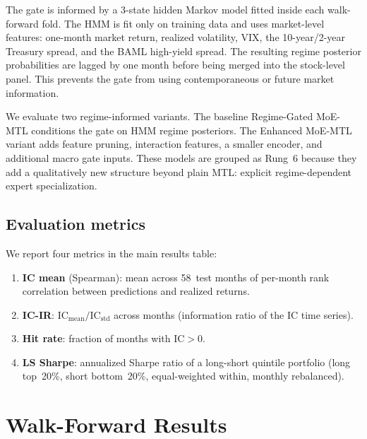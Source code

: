 \documentclass[11pt]{article}
\begin{document}
The gate is informed by a 3-state hidden Markov model fitted inside
each walk-forward fold. The HMM is fit only on training data and uses
market-level features: one-month market return, realized volatility,
VIX, the 10-year/2-year Treasury spread, and the BAML high-yield
spread. The resulting regime posterior probabilities are lagged by one
month before being merged into the stock-level panel. This prevents the
gate from using contemporaneous or future market information.

We evaluate two regime-informed variants. The baseline Regime-Gated
MoE-MTL conditions the gate on HMM regime posteriors. The Enhanced
MoE-MTL variant adds feature pruning, interaction features, a smaller
encoder, and additional macro gate inputs. These models are grouped as
Rung~6 because they add a qualitatively new structure beyond plain MTL:
explicit regime-dependent expert specialization.

\subsection{Evaluation metrics}

We report four metrics in the main results table:
\begin{enumerate}[leftmargin=2em,topsep=2pt,itemsep=2pt]
\item \textbf{IC mean} (Spearman): mean across 58~test months of
  per-month rank correlation between predictions and realized returns.
\item \textbf{IC-IR}: $\text{IC}_\text{mean}/\text{IC}_\text{std}$
  across months (information ratio of the IC time series).
\item \textbf{Hit rate}: fraction of months with $\text{IC}>0$.
\item \textbf{LS Sharpe}: annualized Sharpe ratio of a long-short
  quintile portfolio (long top~20\%, short bottom~20\%, equal-weighted
  within, monthly rebalanced).
\end{enumerate}

\section{Walk-Forward Results}\label{sec:results-wf}
\end{document}
